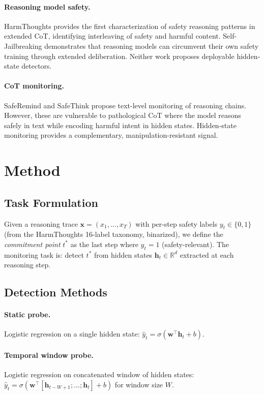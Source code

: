 \documentclass[11pt]{article}
\begin{document}
\paragraph{Reasoning model safety.} HarmThoughts provides the first characterization of safety reasoning patterns in extended CoT, identifying interleaving of safety and harmful content. Self-Jailbreaking demonstrates that reasoning models can circumvent their own safety training through extended deliberation. Neither work proposes deployable hidden-state detectors.

\paragraph{CoT monitoring.} SafeRemind and SafeThink propose text-level monitoring of reasoning chains. However, these are vulnerable to pathological CoT where the model reasons safely in text while encoding harmful intent in hidden states. Hidden-state monitoring provides a complementary, manipulation-resistant signal.

\section{Method}

\subsection{Task Formulation}

Given a reasoning trace $\mathbf{x} = (x_1, \ldots, x_T)$ with per-step safety labels $y_t \in \{0, 1\}$ (from the HarmThoughts 16-label taxonomy, binarized), we define the \emph{commitment point} $t^*$ as the last step where $y_t = 1$ (safety-relevant). The monitoring task is: detect $t^*$ from hidden states $\mathbf{h}_t \in \mathbb{R}^d$ extracted at each reasoning step.

\subsection{Detection Methods}

\paragraph{Static probe.} Logistic regression on a single hidden state: $\hat{y}_t = \sigma(\mathbf{w}^\top \mathbf{h}_t + b)$.

\paragraph{Temporal window probe.} Logistic regression on concatenated window of hidden states: $\hat{y}_t = \sigma(\mathbf{w}^\top [\mathbf{h}_{t-W+1}; \ldots; \mathbf{h}_t] + b)$ for window size $W$.
\end{document}
